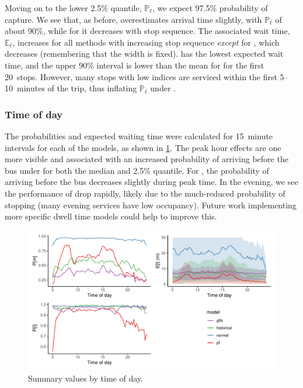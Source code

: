 Moving on to the lower 2.5\% quantile, $\mathbb{P}_\ell$, we expect 97.5\% probability of capture. We see that, as before, \Fpf{} overestimates arrival time slightly, with $\mathbb{P}_\ell$ of about 90\%, while for \Fsched{} it decreases with stop sequence. The associated wait time, $\mathbb{E}_\ell$, increases for all methods with increasing stop sequence \emph{except} for \Fsched{}, which decreases (remembering that the width is fixed). \Fpf{} has the lowest expected wait time, and the upper 90\% interval is lower than the mean for \Fsched{} for the first 20~stops. However, many stops with low indices are serviced within the first 5--10~minutes of the trip, thus inflating $\mathbb{P}_\ell$ under \Fsched{}.


\subsubsection{Time of day}

The probabilities and expected waiting time were calculated for 15~minute intervals for each of the models, as shown in \cref{fig:model_results_pr_timeofday}. The peak hour effects are one more visible and associated with an increased probability of arriving before the bus under \Fpf{} for both the median and 2.5\% quantile. For \Fsched{}, the probability of arriving before the bus decreases slightly during peak time. In the evening, we see the performance of \Fpf{} drop rapidly, likely due to the much-reduced probability of stopping (many evening services have low occupancy). Future work implementing more specific dwell time models could help to improve this.


\begin{knitrout}\small
{}\color{fgcolor}\begin{figure}
\includegraphics[width=\textwidth]{figure/model_results_pr_timeofday-1} \caption[Summary values by time of day]{Summary values by time of day.}\label{fig:model_results_pr_timeofday}
\end{figure}


\end{knitrout}


